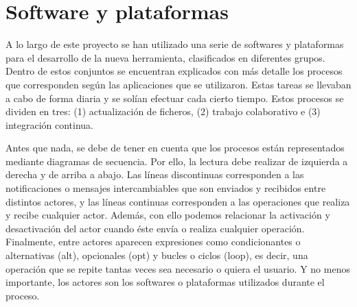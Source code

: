 \section{Software y plataformas}
A lo largo de este proyecto se han utilizado una serie de softwares y plataformas para el desarrollo de la nueva herramienta, clasificados en diferentes grupos. Dentro de estos conjuntos se encuentran explicados con más detalle los procesos que corresponden según las aplicaciones que se utilizaron.  Estas tareas se llevaban a cabo de forma diaria y se solían efectuar cada cierto tiempo. Estos procesos se dividen en tres: (1) actualización de ficheros, (2) trabajo colaborativo e (3) integración continua.

Antes que nada, se debe de tener en cuenta que los procesos están representados mediante diagramas de secuencia. Por ello, la lectura debe realizar de izquierda a derecha y de arriba a abajo. Las líneas discontinuas corresponden a las notificaciones o mensajes intercambiables que son enviados y recibidos entre distintos actores, y las líneas continuas corresponden a las operaciones que realiza y recibe cualquier actor. Además, con ello podemos relacionar la activación y desactivación del actor cuando éste envía o realiza cualquier operación. Finalmente, entre actores aparecen expresiones como condicionantes o alternativas (alt), opcionales (opt) y bucles o ciclos (loop), es decir, una operación que se repite tantas veces sea necesario o quiera el usuario. Y no menos importante, los actores son los softwares o plataformas utilizados durante el proceso.

